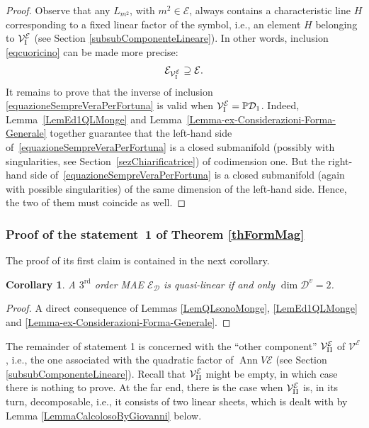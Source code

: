 \documentclass[pdftex]{sigma}
\newcommand{\D}{\mathcal{D}}
\newcommand{\M}{\mathcal{V}}
\newcommand{\MM}{\mathcal{V}_{\textrm{\normalfont I}}}
\newcommand{\MMM}{\mathcal{V}_{\textrm{\normalfont II}}}
\newcommand{\E}{\mathcal{E}}
\newcommand{\Ann}{\operatorname{Ann}}
\renewcommand{\P}{\mathbb{P}}
\newcommand{\Rd}{^\textrm{rd}}
\newcommand{\elle}{H}
\numberwithin{equation}{section}
\newtheorem{Corollary}[Theorem]{Corollary}
\begin{document}
\begin{proof}
Observe that any $L_{m^2}$, with $m^2\in\E$, always contains a characteristic line $\elle$ correspon\-ding to a f\/ixed linear factor of the symbol, i.e., an element $\elle$ belonging to $\MM^\E$ (see Section \ref{subsubComponenteLineare}). In other words, inclusion \eqref{eqcuoricino} can be made more precise:
\begin{gather}\label{equazioneSempreVeraPerFortuna}
\E_{\MM^\E}\supseteq \E.
\end{gather}
 It remains to prove that the inverse of inclusion \eqref{equazioneSempreVeraPerFortuna} is valid when $\MM^\E=\P\D_1$.
 Indeed, Lemma~\ref{LemEd1QLMonge} and Lemma~\ref{Lemma-ex-Considerazioni-Forma-Generale} together guarantee that the left-hand side of~\eqref{equazioneSempreVeraPerFortuna} is a closed submanifold (possibly with singularities, see Section~\ref{sezChiarificatrice}) of codimension one.
But the right-hand side of~\eqref{equazioneSempreVeraPerFortuna} is a closed submanifold (again with possible singularities) of the same dimension of the left-hand side. Hence, the two of them must coincide as well.
\end{proof}

\subsubsection{Proof of the statement~1 of Theorem \ref{thFormMag}}\label{SubStat1}
The proof of its f\/irst claim is contained in the next corollary.
\begin{Corollary}\label{corollariocorollarioso}
A $3\Rd$ order MAE $\E_\D$ is quasi-linear if and only $\dim\D^v=2$.
\end{Corollary}
\begin{proof}
 A direct consequence of Lemmas \ref{LemQLsonoMonge}, \ref{LemEd1QLMonge} and \ref{Lemma-ex-Considerazioni-Forma-Generale}.
\end{proof}

The remainder of statement 1 is concerned with the ``other component'' $\MMM^\E$ of $\M^\E$, i.e., the one associated with the quadratic factor of $\Ann V\E$ (see Section \ref{subsubComponenteLineare}). Recall that $\MMM^\E$ might be empty, in which case there is nothing to prove. At the far end, there is the case when $\MMM^\E$ is, in its turn, decomposable, i.e., it consists of two linear sheets, which is dealt with by Lemma \ref{LemmaCalcolosoByGiovanni} below.
\end{document}
